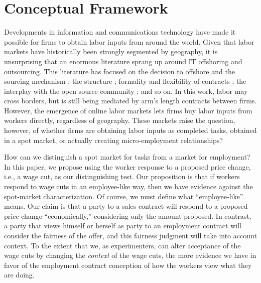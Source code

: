 \documentclass[11pt]{article}
\begin{document}
\section{Conceptual Framework} 
Developments in information and communications technology have made it possible for firms to obtain labor inputs from around the world.
Given that labor markets have historically been strongly segmented by geography, it is unsurprising that an enormous literature sprang up around IT offshoring and outsourcing. 
This literature has focused on the decision to offshore and the sourcing mechanism \citep{tanriverdi2007choice}; the structure \citep{chen2009empirical}; formality \citep{tanriverdi2007choice} and flexibility of contracts \citep{gopal2012asymmetric}; the interplay with the open source community \citep{aagerfalk2008outsourcing}; and so on.
In this work, labor may cross borders, but is still being mediated by arm's length contracts between firms. 
However, the emergence of online labor markets lets firms buy labor inputs from workers directly, regardless of geography.
These markets raise the question, however, of whether firms are obtaining labor inputs as completed tasks, obtained in a spot market, or actually creating micro-employment relationships? 

How can we distinguish a spot market for tasks from a market for employment? 
In this paper, we propose using the worker response to a proposed price change, i.e., a wage cut, as our distinguishing test.
Our proposition is that if workers respond to wage cuts in an employee-like way, then we have evidence against the spot-market characterization. 
Of course, we must define what ``employee-like'' means.
Our claim is that a party to a sales contract will respond to a proposed price change ``economically,'' considering only the amount proposed.
In contrast, a party that views himself or herself as party to an employment contract will consider the fairness of the offer, and this fairness judgment will take into account context.
To the extent that we, as experimenters, can alter acceptance of the wage cuts by changing the \emph{context} of the wage cuts, the more evidence we have in favor of the employment contract conception of how the workers view what they are doing. 
\end{document}
